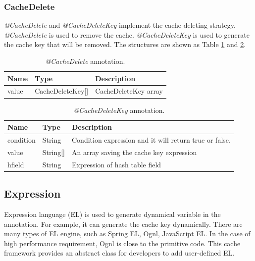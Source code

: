 \documentclass{singlecol-new}
\theoremstyle{TH}{
\newtheorem{lemma}{Lemma}
\newtheorem{theorem}[lemma]{Theorem}
\newtheorem{corrolary}[lemma]{Corrolary}
\newtheorem{conjecture}[lemma]{Conjecture}
\newtheorem{proposition}[lemma]{Proposition}
\newtheorem{claim}[lemma]{Claim}
\newtheorem{stheorem}[lemma]{Wrong Theorem}
}
\theoremstyle{THrm}{
\newtheorem{definition}{Definition}[section]
\newtheorem{question}{Question}[section]
\newtheorem{remark}{Remark}
\newtheorem{scheme}{Scheme}
}
\theoremstyle{THhit}{
\newtheorem{case}{Case}[section]
}
\begin{document}
\subsubsection{CacheDelete}
\textit{@CacheDelete} and \textit{@CacheDeleteKey} implement the cache deleting strategy. \textit{@CacheDelete} is used to remove the cache. \textit{@CacheDeleteKey} is used to generate the cache key that will be removed. The structures are shown as Table \ref{CacheDelete} and \ref{CacheDeleteKey}.

\begin{table}[htb]
\begin{center}
 \caption{\label{CacheDelete}\textit{@CacheDelete} annotation.}
 \begin{tabular}{lll}
 \toprule
Name & Type & Description\\
 \midrule
value & CacheDeleteKey[] & CacheDeleteKey array\\
\bottomrule
 \end{tabular}
\end{center}
\end{table}

\begin{table}[htb]
\begin{center}
 \caption{\label{CacheDeleteKey}\textit{@CacheDeleteKey} annotation.}
 \begin{tabular}{lll}
 \toprule
Name & Type & Description\\
 \midrule
condition & String & Condition expression and it will return true or false.\\ %
value & String[] & An array saving the cache key expression\\
hfield & String & Expression of hash table field\\
\bottomrule
 \end{tabular}
\end{center}
\end{table}

\subsection{Expression}
Expression language (EL) is used to generate dynamical variable in the annotation. For example, it can generate the cache key dynamically. There are many types of EL engine, such as Spring EL, Ognl, JavaScript EL. In the case of high performance requirement, Ognl is close to the primitive code. This cache framework provides an abstract class for developers to add user-defined EL.
\end{document}
